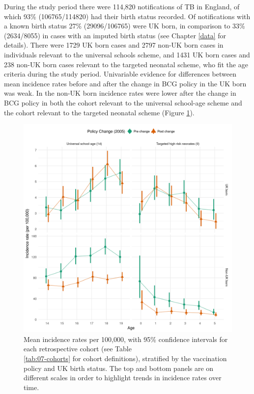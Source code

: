 \documentclass[11pt,twoside]{bristolthesis}
\begin{document}
  During the study period there were 114,820 notifications of TB in England, of which 93\% (106765/114820) had their birth status recorded. Of notifications with a known birth status 27\% (29096/106765) were UK born, in comparison to 33\% (2634/8055) in cases with an imputed birth status (see Chapter \ref{data} for details). There were 1729 UK born cases and 2797 non-UK born cases in individuals relevant to the universal schools scheme, and 1431 UK born cases and 238 non-UK born cases relevant to the targeted neonatal scheme, who fit the age criteria during the study period. Univariable evidence for differences between mean incidence rates before and after the change in BCG policy in the UK born was weak. In the non-UK born incidence rates were lower after the change in BCG policy in both the cohort relevant to the universal school-age scheme and the cohort relevant to the targeted neonatal scheme (Figure \ref{fig:07-cohort-summary-plot}).
  \begin{figure}
  
  {\centering \includegraphics[width=0.8\linewidth,]{chapters/direct-eff-bcg-change/figure-1} 
  
  }
  
  \caption[Mean incidence rates per 100,000, with 95\% confidence intervals for each retrospective cohort, stratified by the vaccination policy and UK birth status.]{Mean incidence rates per 100,000, with 95\% confidence intervals for each retrospective cohort (see Table \\\ref{tab:07-cohorts} for cohort definitions), stratified by the vaccination policy and UK birth status. The top and bottom panels are on different scales in order to highlight trends in incidence rates over time.}\label{fig:07-cohort-summary-plot}
  \end{figure}
\end{document}
